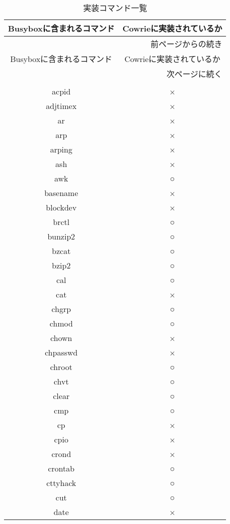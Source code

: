 \begin{longtable}{cc}
 \caption{実装コマンド一覧}
 \label{table:command} \\
 \hline
 Busyboxに含まれるコマンド & Cowrieに実装されているか \\ \hline\hline
 \endfirsthead
 \multicolumn{2}{r}{前ページからの続き} \\ \hline
 Busyboxに含まれるコマンド & Cowrieに実装されているか \\ \hline\hline
 \endhead
 \hline
 \multicolumn{2}{r}{次ページに続く} \\
 \endfoot
 \hline
 \multicolumn{2}{r}{以上} \\
 \endlastfoot
acpid & × \\ \hline
adjtimex & × \\ \hline
ar & × \\ \hline
arp & × \\ \hline
arping & × \\ \hline
ash & × \\ \hline
awk & ○ \\ \hline
basename & × \\ \hline
blockdev & × \\ \hline
brctl & ○ \\ \hline
bunzip2 & ○ \\ \hline
bzcat & ○ \\ \hline
bzip2 & ○ \\ \hline
cal & ○ \\ \hline
cat & × \\ \hline
chgrp & ○ \\ \hline
chmod & ○ \\ 
chown & × \\ \hline
chpasswd & × \\ \hline
chroot & ○ \\ \hline
chvt & ○ \\ \hline
clear & ○ \\ \hline
cmp & ○ \\ \hline
cp & × \\ \hline
cpio & × \\ \hline
crond & × \\ \hline
crontab & ○ \\ \hline
cttyhack & ○ \\ \hline
cut & ○ \\ \hline
date & × \\ \hline

\end{longtable}
